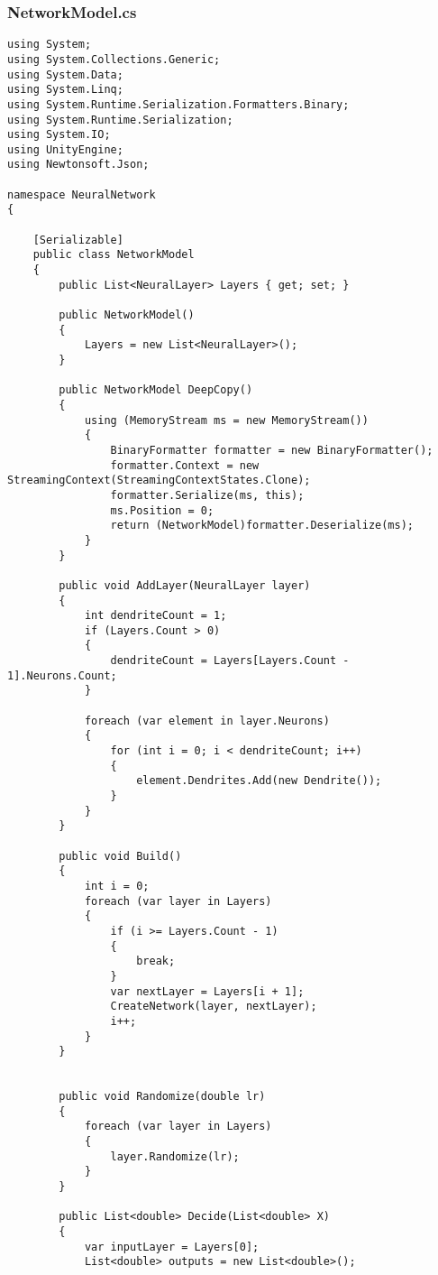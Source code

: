 \documentclass[12pt,a4paper]{article}
\begin{document}
\subsubsection*{NetworkModel.cs}
\begin{lstlisting}
using System;
using System.Collections.Generic;
using System.Data;
using System.Linq;
using System.Runtime.Serialization.Formatters.Binary;
using System.Runtime.Serialization;
using System.IO;
using UnityEngine;
using Newtonsoft.Json;

namespace NeuralNetwork
{

    [Serializable]
    public class NetworkModel
    {
        public List<NeuralLayer> Layers { get; set; }

        public NetworkModel()
        {
            Layers = new List<NeuralLayer>();
        }

        public NetworkModel DeepCopy()
        {
            using (MemoryStream ms = new MemoryStream())
            {
                BinaryFormatter formatter = new BinaryFormatter();
                formatter.Context = new StreamingContext(StreamingContextStates.Clone);
                formatter.Serialize(ms, this);
                ms.Position = 0;
                return (NetworkModel)formatter.Deserialize(ms);
            }
        }

        public void AddLayer(NeuralLayer layer)
        {
            int dendriteCount = 1;
            if (Layers.Count > 0)
            {
                dendriteCount = Layers[Layers.Count - 1].Neurons.Count;
            }

            foreach (var element in layer.Neurons)
            {
                for (int i = 0; i < dendriteCount; i++)
                {
                    element.Dendrites.Add(new Dendrite());
                }
            }
        }

        public void Build()
        {
            int i = 0;
            foreach (var layer in Layers)
            {
                if (i >= Layers.Count - 1)
                {
                    break;
                }
                var nextLayer = Layers[i + 1];
                CreateNetwork(layer, nextLayer);
                i++;
            }
        }


        public void Randomize(double lr)
        {
            foreach (var layer in Layers)
            {
                layer.Randomize(lr);
            }
        }

        public List<double> Decide(List<double> X)
        {
            var inputLayer = Layers[0];
            List<double> outputs = new List<double>();


\end{lstlisting}
\end{document}
